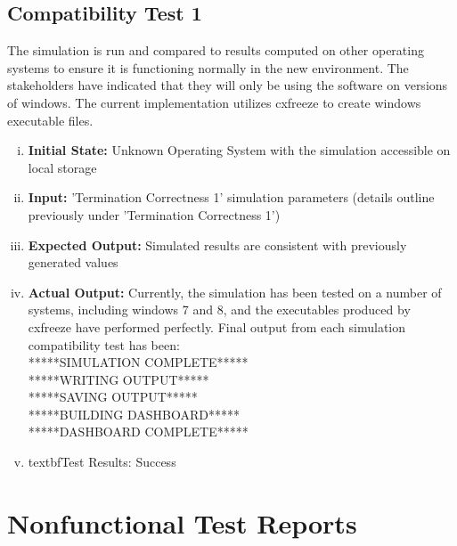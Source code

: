 \documentclass[paper=letter, fontsize=10pt]{scrartcl}
\numberwithin{equation}{section}		%
\numberwithin{figure}{section}			%
\numberwithin{table}{section}				%
\begin{document}
\subsection{Compatibility Test 1} %
The simulation is run and compared to results computed on other operating systems to ensure it is functioning normally in the new environment. The stakeholders have indicated that they will only be using the software on versions of windows. The current implementation utilizes cxfreeze to create windows executable files. 
\begin{enumerate}[(i)]
	\item \textbf{Initial State:} Unknown Operating System with the simulation accessible on local storage
	\item \textbf{Input:} 'Termination Correctness 1' simulation parameters (details outline previously under 'Termination Correctness 1')
	\item \textbf{Expected Output:} Simulated results are consistent with previously generated values
	\item \textbf{Actual Output:} Currently, the simulation has been tested on a number of systems, including windows 7 and 8, and the executables produced by cxfreeze have performed perfectly. Final output from each simulation compatibility test has been: \\
	*****SIMULATION COMPLETE*****\\
	*****WRITING OUTPUT*****\\
	*****SAVING OUTPUT*****\\
	*****BUILDING DASHBOARD*****\\
	*****DASHBOARD COMPLETE*****\\
	\item textbf{Test Results:} Success
\end{enumerate}

\section{Nonfunctional Test Reports}
\end{document}
